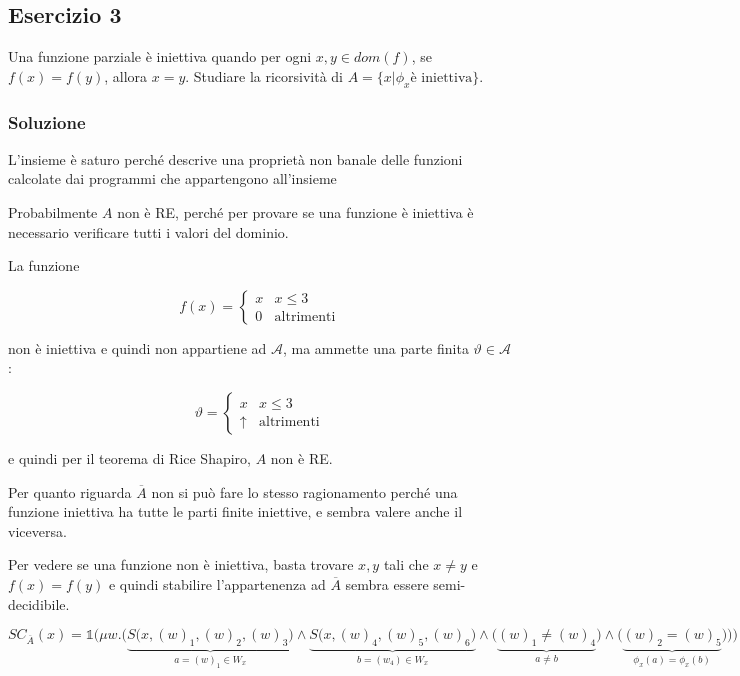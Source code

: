 \subsection{Esercizio 3}

Una funzione parziale è iniettiva quando per ogni $x, y \in dom(f)$, se $f(x) = f(y)$, allora $x = y$. Studiare la ricorsività di $A = \{ x | \phi_x \text{è iniettiva} \}$.

\subsubsection{Soluzione}

L'insieme è saturo perché descrive una proprietà non banale delle funzioni calcolate dai programmi che appartengono all'insieme

Probabilmente $A$ non è RE, perché per provare se una funzione è iniettiva è necessario verificare tutti i valori del dominio.

La funzione 

$$
f(x) = \begin{cases}
x &x \leq 3 \\
0 &\text{altrimenti}
\end{cases}
$$

non è iniettiva e quindi non appartiene ad $\mathcal{A}$, ma ammette una parte finita $\vartheta \in \mathcal{A}$:

$$
\vartheta = \begin{cases}
x &x \leq 3 \\
\uparrow &\text{altrimenti}
\end{cases}
$$

e quindi per il teorema di Rice Shapiro, $A$ non è RE.

Per quanto riguarda $\overline{A}$ non si può fare lo stesso ragionamento perché una funzione iniettiva ha tutte le parti finite iniettive, e sembra valere anche il viceversa.

Per vedere se una funzione non è iniettiva, basta trovare $x,y$ tali che $x \neq y$ e $f(x) = f(y)$ e quindi stabilire l'appartenenza ad $\overline{A}$ sembra essere semi-decidibile.

$$
SC_{\overline{A}}(x)  = \mathbb{1}\Bigg(\mu w . \bigg( \underbrace{ S\Big(x, (w)_1, (w)_2, (w)_3\Big)}_{a = (w)_1 \in W_x} \wedge \underbrace{S\Big(x, (w)_4, (w)_5, (w)_6\Big)}_{b = (w_4) \in W_x} \wedge \Big( \underbrace{(w)_1 \neq (w)_4}_{a \neq b} \Big) \wedge \Big(\underbrace{(w)_2 = (w)_5}_{\phi_x(a)= \phi_x(b)}\Big) \bigg) \Bigg)
$$

